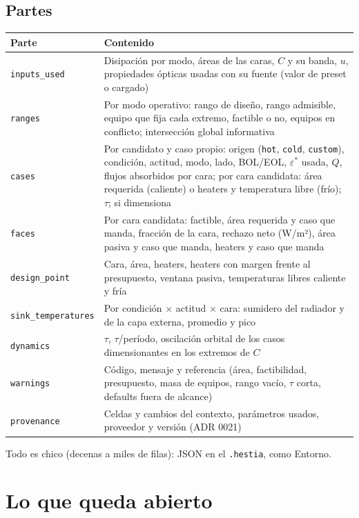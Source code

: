 \documentclass[11pt,a4paper]{article}
\newcommand{\code}[1]{\texttt{#1}}
\begin{document}
\subsection{Partes}

{\small
\begin{xltabular}{\textwidth}{@{}P{3.2cm}L@{}}
\toprule
\textbf{Parte} & \textbf{Contenido} \\
\midrule
\endhead
\code{inputs\_used} & Disipación por modo, áreas de las caras, $C$ y su banda, $u$, propiedades ópticas usadas con su fuente (valor de preset o cargado) \\
\code{ranges} & Por modo operativo: rango de diseño, rango admisible, equipo que fija cada extremo, factible o no, equipos en conflicto; intersección global informativa \\
\code{cases} & Por candidato y caso propio: origen (\code{hot}, \code{cold}, \code{custom}), condición, actitud, modo, lado, BOL/EOL, $\varepsilon^*$ usada, $Q$, flujos absorbidos por cara; por cara candidata: área requerida (caliente) o heaters y temperatura libre (frío); $\tau$; si dimensiona \\
\code{faces} & Por cara candidata: factible, área requerida y caso que manda, fracción de la cara, rechazo neto (W/m²), área pasiva y caso que manda, heaters y caso que manda \\
\code{design\_point} & Cara, área, heaters, heaters con margen frente al presupuesto, ventana pasiva, temperaturas libres caliente y fría \\
\code{sink\_temperatures} & Por condición $\times$ actitud $\times$ cara: sumidero del radiador y de la capa externa, promedio y pico \\
\code{dynamics} & $\tau$, $\tau$/período, oscilación orbital de los casos dimensionantes en los extremos de $C$ \\
\code{warnings} & Código, mensaje y referencia (área, factibilidad, presupuesto, masa de equipos, rango vacío, $\tau$ corta, defaults fuera de alcance) \\
\code{provenance} & Celdas y cambios del contexto, parámetros usados, proveedor y versión (ADR 0021) \\
\bottomrule
\end{xltabular}
}

Todo es chico (decenas a miles de filas): JSON en el \code{.hestia}, como Entorno.

\section{Lo que queda abierto}\label{sec:abierto}
\end{document}
